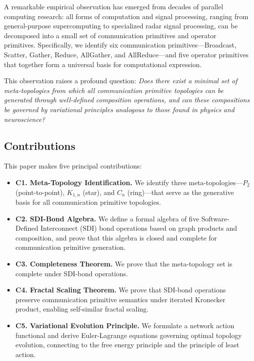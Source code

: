 \documentclass[12pt]{article}
\begin{document}
A remarkable empirical observation has emerged from decades of
parallel computing research: all forms of computation and signal
processing, ranging from general-purpose supercomputing to specialized
radar signal processing, can be decomposed into a small set of
communication primitives and operator primitives. Specifically, we
identify six communication primitives---Broadcast, Scatter, Gather,
Reduce, AllGather, and AllReduce---and five operator primitives that
together form a universal basis for computational expression.

This observation raises a profound question:
\textit{Does there exist a minimal set of meta-topologies from which
all communication primitive topologies can be generated through
well-defined composition operations, and can these compositions be
governed by variational principles analogous to those found in
physics and neuroscience?}

\subsection{Contributions}

This paper makes five principal contributions:
\begin{itemize}
\item \textbf{C1. Meta-Topology Identification.} We identify three
meta-topologies---$P_2$ (point-to-point), $K_{1,n}$ (star), and
$C_n$ (ring)---that serve as the generative basis for all
communication primitive topologies.
\item \textbf{C2. SDI-Bond Algebra.} We define a formal algebra of
five Software-Defined Interconnect (SDI) bond operations based on
graph products and composition, and prove that this algebra is
closed and complete for communication primitive generation.
\item \textbf{C3. Completeness Theorem.} We prove that the
meta-topology set is complete under SDI-bond operations.
\item \textbf{C4. Fractal Scaling Theorem.} We prove that SDI-bond
operations preserve communication primitive semantics under
iterated Kronecker product, enabling self-similar fractal scaling.
\item \textbf{C5. Variational Evolution Principle.} We formulate a
network action functional and derive Euler-Lagrange equations
governing optimal topology evolution, connecting to the free energy
principle and the principle of least action.
\end{itemize}
\end{document}
